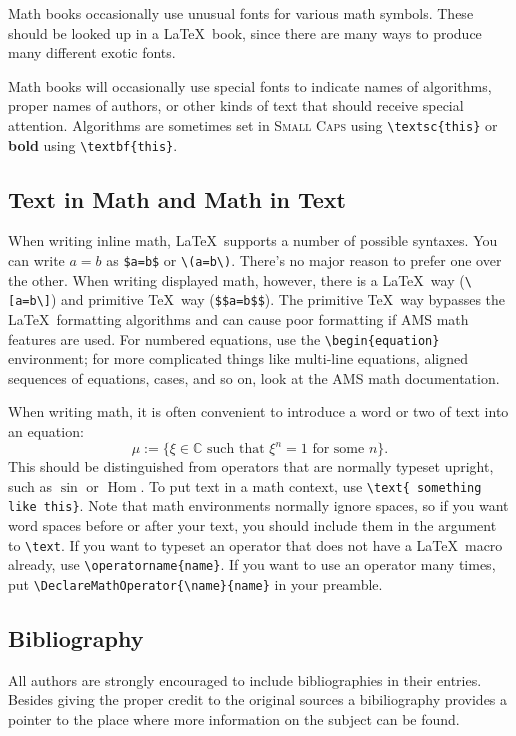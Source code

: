 Math books occasionally use unusual fonts for various math symbols. These should be looked up in a \LaTeX\ book, since there are many ways to produce many different exotic fonts.

Math books will occasionally use special fonts to indicate names of algorithms, proper names of authors, or other kinds of text that should receive special attention. Algorithms are sometimes set in \textsc{Small Caps} using \verb|\textsc{this}| or \textbf{bold} using \verb|\textbf{this}|.

\subsection{Text in Math and Math in Text}

When writing inline math, \LaTeX\ supports a number of possible syntaxes. You can write $a=b$ as \verb|$a=b$| or \verb|\(a=b\)|. There's no major reason to prefer one over the other. When writing displayed math, however, there is a \LaTeX\ way (\verb|\[a=b\]|) and primitive \TeX\ way (\verb|$$a=b$$|). The primitive \TeX\ way bypasses the \LaTeX\ formatting algorithms and can cause poor formatting if AMS math features are used. For numbered equations, use the \verb|\begin{equation}| environment; for more complicated things like multi-line equations, aligned sequences of equations, cases, and so on, look at the AMS math documentation.

When writing math, it is often convenient to introduce a word or two of text into an equation:
\[
\mu:=\{\xi\in \mathbb{C}\text{ such that }\xi^n=1\text{ for some }n\}.
\]
This should be distinguished from operators that are normally typeset upright, such as $\sin$ or $\operatorname{Hom}$. To put text in a math context, use \verb|\text{ something like this}|. Note that math environments normally ignore spaces, so if you want word spaces before or after your text, you should include them in the argument to \verb|\text|. If you want to typeset an operator that does not have a \LaTeX\ macro already, use \verb|\operatorname{name}|. If you want to use an operator many times, put \verb|\DeclareMathOperator{\name}{name}| in your preamble.

\subsection*{Bibliography}
All authors are strongly encouraged to include bibliographies in their entries. Besides giving the proper credit to the original sources a bibiliography provides a pointer to the place where more information on the subject can be found.

